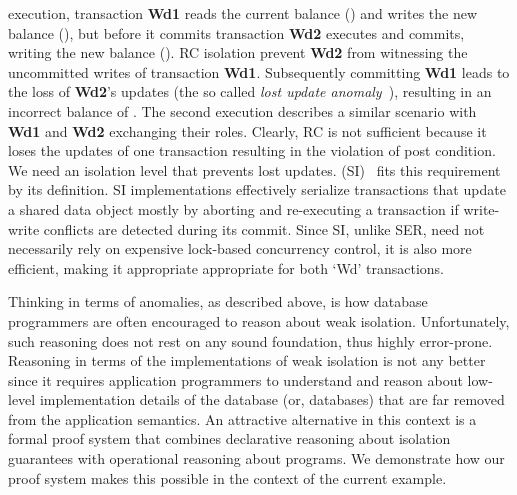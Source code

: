 execution, transaction {\bf Wd1} reads the current balance () and
writes the new balance (), but before it commits transaction
{\bf Wd2} executes and commits, writing the new balance (). RC
isolation prevent {\bf Wd2} from witnessing the uncommitted writes of
transaction {\bf Wd1}.  Subsequently committing {\bf Wd1} leads to the
loss of {\bf Wd2}'s updates (the so called \emph{lost update
anomaly}~\cite{berenson}), resulting in an incorrect balance of
. The second execution describes a similar scenario with {\bf
Wd1} and {\bf Wd2} exchanging their roles.  Clearly, RC is not
sufficient because it loses the updates of one transaction resulting
in the violation of post condition.  We need an isolation level that
prevents lost updates.   (SI)~\cite{berenson}
fits this requirement by its definition. SI implementations
effectively serialize transactions that update a shared data object
mostly by aborting and re-executing a transaction if write-write
conflicts are detected during its commit.  Since SI, unlike SER, need
not necessarily rely on expensive lock-based concurrency control, it
is also more efficient, making it appropriate appropriate for both
`Wd' transactions. 

Thinking in terms of anomalies, as described above, is how database
programmers are often encouraged to reason about weak isolation.
Unfortunately, such reasoning does not rest on any sound foundation,
thus highly error-prone. Reasoning in terms of the implementations of
weak isolation is not any better since it requires application
programmers to understand and reason about low-level implementation
details of the database (or, databases) that are far removed from the
application semantics. An attractive alternative in this context is a
formal proof system that combines declarative reasoning about
isolation guarantees with operational reasoning about programs. We
demonstrate how our proof system makes this possible in the context of
the current example.

